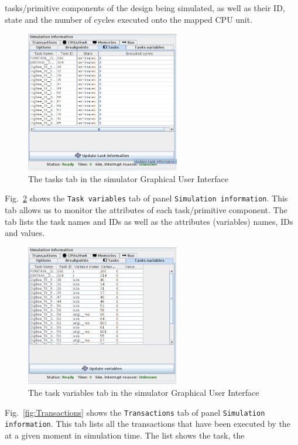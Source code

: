 \documentclass{llncs}
\begin{document}
tasks/primitive components of the design being simulated, as well as their ID, state and the number of cycles executed
onto the mapped CPU unit.
%
\begin{figure}[!htbp]
	\centering
	\includegraphics[width=0.6\textwidth]{figures/screenshot/Tasks.png}
	\caption{The tasks tab in the simulator Graphical User Interface}
	\label{fig:Tasks}
\end{figure}
%
Fig.~\ref{fig:TasksVariables} shows the \texttt{Task variables} tab of panel \texttt{Simulation information}. This tab
allows us to monitor the attributes of each task/primitive component. The tab lists the task names and IDs as well as the
attributes (variables) names, IDs and values.
%
\begin{figure}[!htbp]
	\centering
	\includegraphics[width=0.6\textwidth]{figures/screenshot/TaskVariables.png}
	\caption{The task variables tab in the simulator Graphical User Interface}
	\label{fig:TasksVariables}
\end{figure}
%
Fig.~\ref{fig:Transactions} shows the \texttt{Transactions} tab of panel \texttt{Simulation information}. This tab lists
all the transactions that have been executed by the at a given moment in simulation time. The list shows the task, the
\end{document}
